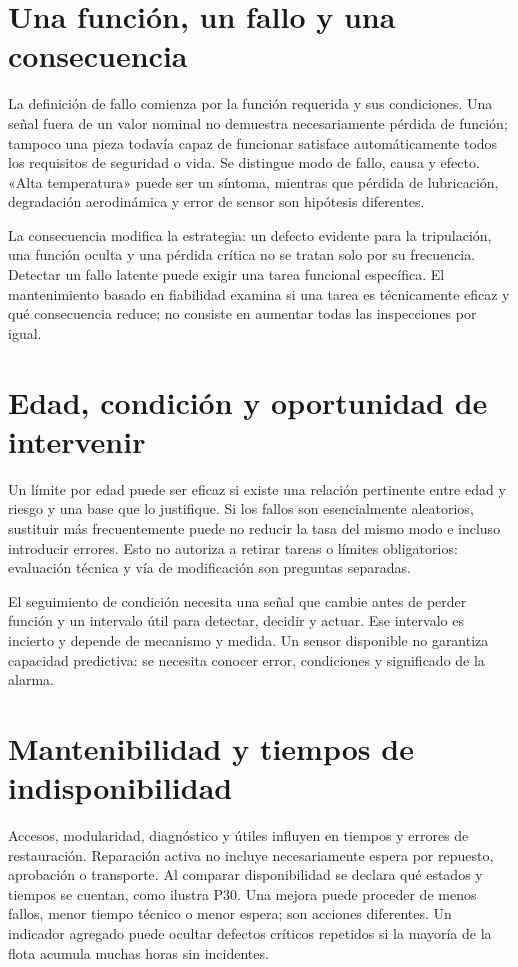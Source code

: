 
\section{Una función, un fallo y una consecuencia}
La definición de fallo comienza por la función requerida y sus condiciones. Una señal fuera de un valor nominal no demuestra necesariamente pérdida de función; tampoco una pieza todavía capaz de funcionar satisface automáticamente todos los requisitos de seguridad o vida. Se distingue modo de fallo, causa y efecto. «Alta temperatura» puede ser un síntoma, mientras que pérdida de lubricación, degradación aerodinámica y error de sensor son hipótesis diferentes.

La consecuencia modifica la estrategia: un defecto evidente para la tripulación, una función oculta y una pérdida crítica no se tratan solo por su frecuencia. Detectar un fallo latente puede exigir una tarea funcional específica. El mantenimiento basado en fiabilidad examina si una tarea es técnicamente eficaz y qué consecuencia reduce; no consiste en aumentar todas las inspecciones por igual.
\section{Edad, condición y oportunidad de intervenir}
Un límite por edad puede ser eficaz si existe una relación pertinente entre edad y riesgo y una base que lo justifique. Si los fallos son esencialmente aleatorios, sustituir más frecuentemente puede no reducir la tasa del mismo modo e incluso introducir errores. Esto no autoriza a retirar tareas o límites obligatorios: evaluación técnica y vía de modificación son preguntas separadas.

El seguimiento de condición necesita una señal que cambie antes de perder función y un intervalo útil para detectar, decidir y actuar. Ese intervalo es incierto y depende de mecanismo y medida. Un sensor disponible no garantiza capacidad predictiva: se necesita conocer error, condiciones y significado de la alarma.
\section{Mantenibilidad y tiempos de indisponibilidad}
Accesos, modularidad, diagnóstico y útiles influyen en tiempos y errores de restauración. Reparación activa no incluye necesariamente espera por repuesto, aprobación o transporte. Al comparar disponibilidad se declara qué estados y tiempos se cuentan, como ilustra P30. Una mejora puede proceder de menos fallos, menor tiempo técnico o menor espera; son acciones diferentes. Un indicador agregado puede ocultar defectos críticos repetidos si la mayoría de la flota acumula muchas horas sin incidentes.
